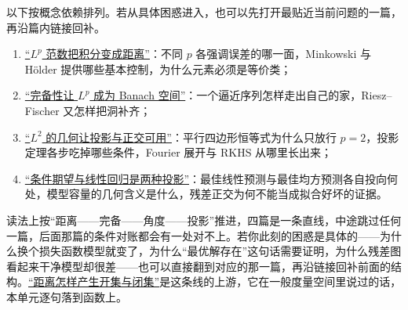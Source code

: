 以下按概念依赖排列。若从具体困惑进入，也可以先打开最贴近当前问题的一篇，再沿篇内链接回补。

\begin{enumerate}
\tightlist
\item
  \hyperref[sec:12-Real-Analysis-Support/07-Lp-Spaces-and-Function-Geometry/01]{``\(L^p\) 范数把积分变成距离''}：不同 \(p\) 各强调误差的哪一面，Minkowski 与 Hölder 提供哪些基本控制，为什么元素必须是等价类；
\item
  \hyperref[sec:12-Real-Analysis-Support/07-Lp-Spaces-and-Function-Geometry/02]{``完备性让 \(L^p\) 成为 Banach 空间''}：一个逼近序列怎样走出自己的家，Riesz--Fischer 又怎样把洞补齐；
\item
  \hyperref[sec:12-Real-Analysis-Support/07-Lp-Spaces-and-Function-Geometry/03]{``\(L^2\) 的几何让投影与正交可用''}：平行四边形恒等式为什么只放行 \(p=2\)，投影定理各步吃掉哪些条件，Fourier 展开与 RKHS 从哪里长出来；
\item
  \hyperref[sec:12-Real-Analysis-Support/07-Lp-Spaces-and-Function-Geometry/04]{``条件期望与线性回归是两种投影''}：最佳线性预测与最佳均方预测各自投向何处，模型容量的几何含义是什么，残差正交为何不能当成拟合好坏的证据。
\end{enumerate}

读法上按``距离——完备——角度——投影''推进，四篇是一条直线，中途跳过任何一篇，后面那篇的条件对账都会有一处对不上。若你此刻的困惑是具体的——为什么换个损失函数模型就变了，为什么``最优解存在''这句话需要证明，为什么残差图看起来干净模型却很差——也可以直接翻到对应的那一篇，再沿链接回补前面的结构。\hyperref[sec:12-Real-Analysis-Support/03-Topology-Basics/01]{``距离怎样产生开集与闭集''}是这条线的上游，它在一般度量空间里说过的话，本单元逐句落到函数上。
